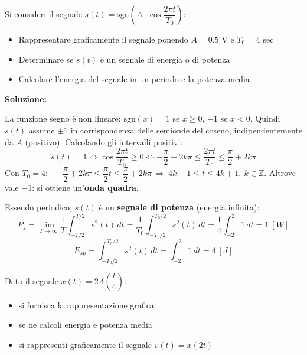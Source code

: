 \documentclass[12pt, a4paper]{article}
\begin{document}
\bigskip

\begin{tcolorbox}[colback=lightergray!10, colframe=tocsec, title=\textbf{Esercizio 2}]
Si consideri il segnale $s(t) = \text{sgn}\!\left(A\cdot\cos\dfrac{2\pi t}{T_0}\right)$:
\begin{itemize}
    \item Rappresentare graficamente il segnale ponendo $A=0.5$ V e $T_0=4$ sec
    \item Determinare se $s(t)$ è un segnale di energia o di potenza
    \item Calcolare l'energia del segnale in un periodo e la potenza media
\end{itemize}
\end{tcolorbox}

\textbf{Soluzione:}

La funzione segno è non lineare: $\text{sgn}(x)=1$ se $x\ge0$, $-1$ se $x<0$. Quindi $s(t)$ assume $\pm1$ in corrispondenza delle semionde del coseno, indipendentemente da $A$ (positivo). Calcolando gli intervalli positivi:
$$s(t)=1 \iff \cos\frac{2\pi t}{T_0}\ge0 \iff -\frac\pi2+2k\pi\le\frac{2\pi t}{T_0}\le\frac\pi2+2k\pi$$
Con $T_0=4$: $\ -\dfrac{\pi}{2}+2k\pi\le\dfrac{\pi}{2}t\le\dfrac\pi2+2k\pi\ \Rightarrow\ 4k-1\le t\le4k+1,\ k\in\mathbb{Z}$. Altrove vale $-1$: si ottiene un'\textbf{onda quadra}.

\begin{center}
\end{center}

Essendo periodico, $s(t)$ è un \textbf{segnale di potenza} (energia infinita):
$$P_s = \lim_{T\to\infty}\frac1T\int_{-T/2}^{T/2}s^2(t)\,dt = \frac{1}{T_0}\int_{-T_0/2}^{T_0/2}s^2(t)\,dt = \frac14\int_{-2}^{2}1\,dt = 1\ [W]$$
$$E_{sp} = \int_{-T_0/2}^{T_0/2}s^2(t)\,dt = \int_{-2}^{2}1\,dt = 4\ [J]$$

\bigskip

\begin{tcolorbox}[colback=lightergray!10, colframe=tocsec, title=\textbf{Esercizio 3}]
Dato il segnale $x(t)=2\Lambda\!\left(\dfrac{t}{4}\right)$:
\begin{itemize}
    \item si fornisca la rappresentazione grafica
    \item se ne calcoli energia e potenza media
    \item si rappresenti graficamente il segnale $v(t)=x(2t)$
\end{itemize}
\end{tcolorbox}
\end{document}
